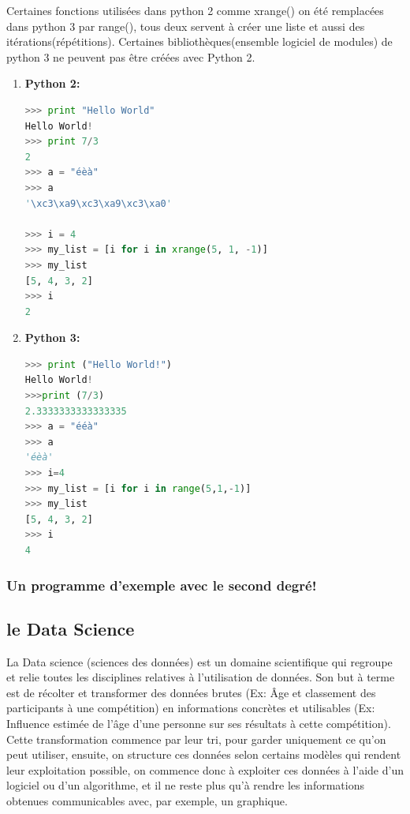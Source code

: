 \documentclass[a4paper, 12pt]{article}
\numberwithin{equation}{subsection}
\begin{document}
Certaines fonctions utilisées dans python 2 comme xrange() on été remplacées dans python 3 par range(), tous deux servent à créer une liste et aussi des itérations(répétitions). Certaines bibliothèques(ensemble logiciel de modules) de python 3 ne peuvent pas être créées avec Python 2.\\
\begin{enumerate}
  \item \textbf{Python 2:}
\begin{lstlisting}[language=Python]
>>> print "Hello World"
Hello World!
>>> print 7/3
2
>>> a = "éèà"
>>> a
'\xc3\xa9\xc3\xa9\xc3\xa0'

>>> i = 4
>>> my_list = [i for i in xrange(5, 1, -1)]
>>> my_list
[5, 4, 3, 2]
>>> i
2
\end{lstlisting}
  \item \textbf{Python 3:}
\begin{lstlisting}[language=Python]
>>> print ("Hello World!")
Hello World!
>>>print (7/3)
2.3333333333333335
>>> a = "ééà"
>>> a
'éèà'
>>> i=4
>>> my_list = [i for i in range(5,1,-1)]
>>> my_list
[5, 4, 3, 2]
>>> i
4
\end{lstlisting}
\end{enumerate}
\subsubsection{Un programme d'exemple avec le second degré!}

\newpage
\subsection{le Data Science}
La Data science (sciences des données) est un domaine scientifique qui regroupe et relie toutes les disciplines relatives à l'utilisation de données. Son but à terme est de récolter et transformer des données brutes (Ex: Âge et classement des participants à une compétition) en informations concrètes et utilisables (Ex: Influence estimée de l'âge d'une personne sur ses résultats à cette compétition). Cette transformation commence par leur tri, pour garder uniquement ce qu'on peut utiliser, ensuite, on structure ces données selon certains modèles qui rendent leur exploitation possible, on commence donc à exploiter ces données à l'aide d'un logiciel ou d'un algorithme, et il ne reste plus qu'à rendre les informations obtenues communicables avec, par exemple, un graphique.\\
\end{document}
